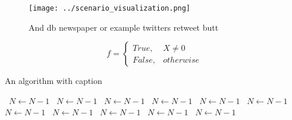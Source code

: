 \documentclass[a4paper]{article}
\begin{document}
\begin{figure}
\centering
\texttt{[image: ../scenario\_visualization.png]}
\caption{And db newspaper or example twitters retweet butt
}
\end{figure}
 
\begin{equation}   f =
\begin{cases} True, & X \neq 0\\
False, & otherwise
\end{cases}
\end{equation}

\begin{algorithm}
\caption{An algorithm with caption}
\begin{algorithmic}
\    \State $N \gets N - 1$
\    \State $N \gets N - 1$
\    \State $N \gets N - 1$
\    \State $N \gets N - 1$
\    \State $N \gets N - 1$
\    \State $N \gets N - 1$
\    \State $N \gets N - 1$
\    \State $N \gets N - 1$
\    \State $N \gets N - 1$
\    \State $N \gets N - 1$
\    \State $N \gets N - 1$
\EndWhile
\end{algorithmic}
\end{algorithm}
\end{document}
